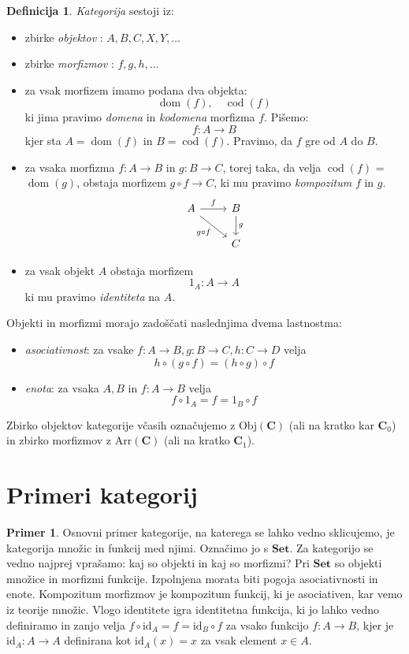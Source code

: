 \documentclass[12pt,a4paper]{book}
\theoremstyle{definition}
\newtheorem{definicija}{Definicija}[chapter]
\theoremstyle{plain}
\theoremstyle{definition}
\newtheorem{primer}{Primer}[section]
\theoremstyle{remark}
\newcommand{\cat}[1]{\textbf{#1}}
\DeclareMathOperator{\dom}{dom}
\DeclareMathOperator{\cod}{cod}
\begin{document}
\begin{definicija}
\emph{Kategorija} sestoji iz:
\begin{itemize}
\item zbirke \emph{objektov} : $A,B,C,X,Y,\ldots$
\item zbirke \emph{morfizmov} : $f,g,h,\ldots$
\item za vsak morfizem imamo podana dva objekta: 
$$\dom(f), \quad \cod(f)$$
ki jima pravimo \emph{domena} in \emph{kodomena} morfizma $f$. Pišemo:
$$f\colon A \to B$$
kjer sta $A = \dom(f)$ in $B = \cod(f)$.
Pravimo, da $f$ gre od $A$ do $B$.
\item za vsaka morfizma $f \colon A \to B$ in $g \colon B \to C$, torej taka, da velja $\cod(f)$ = $\dom(g)$, obstaja morfizem $g\circ f \to C$, ki mu pravimo \emph{kompozitum} $f$ in $g$.
%
\[
\begin{tikzcd}
A \arrow[r, "f"] \arrow[rd, "g \circ f"']  & B  \arrow[d, "g"] \\
				& C
\end{tikzcd}
\] 
%
\item za vsak objekt $A$ obstaja morfizem
$$1_A : A \to A$$
ki mu pravimo \emph{identiteta} na $A$.		
\end{itemize}
Objekti in morfizmi morajo zadoščati naslednjima dvema lastnostma:
\begin{itemize}
\item \emph{asociativnost}: za vsake $f : A \to B, g : B \to C, h : C \to D$ velja
$$h \circ (g \circ f) = (h \circ g) \circ f$$
\item \emph{enota}: za vsaka $A,B$ in $f : A \to B$ velja
$$f \circ 1_A = f = 1_B \circ f$$
\end{itemize}
\end{definicija}
%
Zbirko objektov kategorije včasih označujemo z $\mathrm{Obj}(\cat{C})$ (ali na kratko kar $\cat{C}_0$) in zbirko morfizmov z $\mathrm{Arr}(\cat{C})$ (ali na kratko $\cat{C}_1$).

\section{Primeri kategorij}

\begin{primer}
Osnovni primer kategorije, na katerega se lahko vedno sklicujemo, je kategorija množic in funkcij med njimi. Označimo jo s $\cat{Set}$. Za kategorijo se vedno najprej vprašamo: kaj so objekti in kaj so morfizmi? Pri $\cat{Set}$ so objekti množice in morfizmi funkcije.
Izpolnjena morata biti pogoja asociativnosti in enote.
Kompozitum morfizmov je kompozitum funkcij, ki je asociativen, kar vemo iz teorije množic.
Vlogo identitete igra identitetna funkcija, ki jo lahko vedno definiramo in zanjo velja $f \circ \mathrm{id}_A = f = \mathrm{id}_B \circ f$ za vsako funkcijo $f : A \to B$, kjer je $\mathrm{id}_A : A \to A$ definirana kot $\mathrm{id}_A(x) = x$ za vsak element $x \in A$.
\end{primer}
\end{document}
